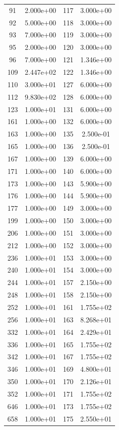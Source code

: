 \documentclass[12pt]{article}
\begin{document}
\begin{longtable}{@{}cccc@{}}
91 & 2.000e+00 & 117 & 3.000e+00 \\
92 & 5.000e+00 & 118 & 3.000e+00 \\
93 & 7.000e+00 & 119 & 3.000e+00 \\
95 & 2.000e+00 & 120 & 3.000e+00 \\
96 & 7.000e+00 & 121 & 1.346e+00 \\
109 & 2.447e+02 & 122 & 1.346e+00 \\
110 & 3.000e+01 & 127 & 6.000e+00 \\
112 & 9.830e+02 & 128 & 6.000e+00 \\
123 & 1.000e+01 & 131 & 6.000e+00 \\
161 & 1.000e+00 & 132 & 6.000e+00 \\
163 & 1.000e+00 & 135 & 2.500e-01 \\
165 & 1.000e+00 & 136 & 2.500e-01 \\
167 & 1.000e+00 & 139 & 6.000e+00 \\
171 & 1.000e+00 & 140 & 6.000e+00 \\
173 & 1.000e+00 & 143 & 5.900e+00 \\
176 & 1.000e+00 & 144 & 5.900e+00 \\
177 & 1.000e+00 & 149 & 3.000e+00 \\
199 & 1.000e+00 & 150 & 3.000e+00 \\
206 & 1.000e+00 & 151 & 3.000e+00 \\
212 & 1.000e+00 & 152 & 3.000e+00 \\
236 & 1.000e+01 & 153 & 3.000e+00 \\
240 & 1.000e+01 & 154 & 3.000e+00 \\
244 & 1.000e+01 & 157 & 2.150e+00 \\
248 & 1.000e+01 & 158 & 2.150e+00 \\
252 & 1.000e+01 & 161 & 1.755e+02 \\
256 & 1.000e+01 & 163 & 8.268e+01 \\
332 & 1.000e+01 & 164 & 2.429e+01 \\
336 & 1.000e+01 & 165 & 1.755e+02 \\
342 & 1.000e+01 & 167 & 1.755e+02 \\
346 & 1.000e+01 & 169 & 4.800e+01 \\
350 & 1.000e+01 & 170 & 2.126e+01 \\
352 & 1.000e+01 & 171 & 1.755e+02 \\
646 & 1.000e+01 & 173 & 1.755e+02 \\
658 & 1.000e+01 & 175 & 2.550e+01 \\

\end{longtable}
\end{document}
